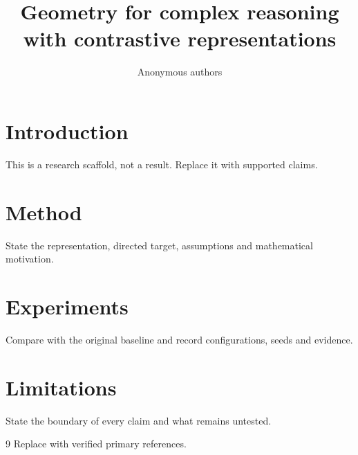 \documentclass{article}
\title{Geometry for complex reasoning with contrastive representations}
\author{Anonymous authors}
\begin{document}
\maketitle
\begin{abstract}

\end{abstract}
\section{Introduction}
This is a research scaffold, not a result. Replace it with supported claims.
\section{Method}
State the representation, directed target, assumptions and mathematical motivation.
\section{Experiments}
Compare with the original baseline and record configurations, seeds and evidence.
\section{Limitations}
State the boundary of every claim and what remains untested.
\label{crux:main-end}
\begin{thebibliography}{9}
 Replace with verified primary references.
\end{thebibliography}
\end{document}

